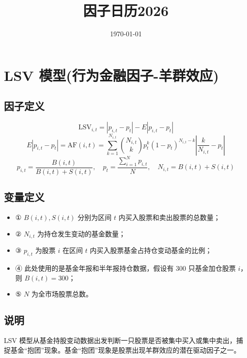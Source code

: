 \documentclass{article}
\title{因子日历2026}
\date{\today}
\begin{document}
\maketitle

\section{LSV 模型(行为金融因子-羊群效应)}

\subsection{因子定义}
\begin{equation}
    \mathrm{LSV}_{i,t} = |p_{i,t} - p_t| - E|p_{i,t} - p_t|
\end{equation}
\begin{equation}
    E|p_{i,t} - p_t| = \mathrm{AF}(i,t) = \sum_{k=1}^{N_{i,t}} \binom{N_{i,t}}{k} p_t^k (1 - p_t)^{N_{i,t} - k} \left| \frac{k}{N_{i,t}} - p_t \right|
\end{equation}
\begin{equation}
    p_{i,t} = \frac{B(i,t)}{B(i,t) + S(i,t)}, \quad p_t = \frac{\sum_{i=1}^N p_{i,t}}{N}, \quad N_{i,t} = B(i,t) + S(i,t)
\end{equation}

\subsection{变量定义}
\begin{itemize}
    \item ① \( B(i,t), S(i,t) \) 分别为区间 \( t \) 内买入股票和卖出股票的总数量；
    \item ② \( N_{i,t} \) 为持仓发生变动的基金数量；
    \item ③ \( p_{i,t} \) 为股票 \( i \) 在区间 \( t \) 内买入股票基金占持仓变动基金的比例；
    \item ④ 此处使用的是基金年报和半年报持仓数据，假设有 300 只基金加仓股票 \( i \)，则 \( B(i,t) = 300 \)；
    \item ⑤ \( N \) 为全市场股票总数。
\end{itemize}

\subsection{说明}
LSV 模型从基金持股变动数据出发判断一只股票是否被集中买入或集中卖出，捕捉基金“抱团”现象。基金“抱团”现象是股票出现羊群效应的潜在驱动因子之一。
\end{document}
